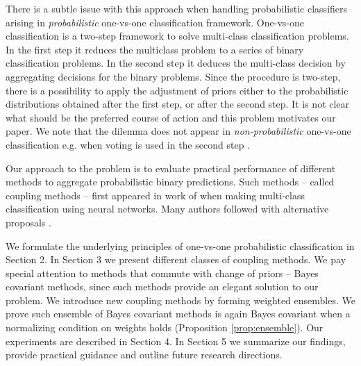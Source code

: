 There is a subtle issue with this approach  when handling probabilistic 
classifiers arising in \emph{probabilistic} one-vs-one classification framework.   
One-vs-one classification is a two-step framework to solve 
multi-class classification problems.
In the first step it reduces the multiclass problem to a series of binary
classification problems. 
In the second step it deduces the multi-class decision by aggregating decisions 
for the binary problems. Since the procedure is two-step, there is a possibility 
to apply the adjustment of priors either to the probabilistic distributions 
obtained after the first step, or after the second step. It is not clear what 
should be the preferred course of action and this problem motivates our paper. We note that the dilemma does not appear
in \emph{non-probabilistic} one-vs-one classification e.g. when voting is used in the second step \cite{galar2011overview}.


Our approach to the problem is to evaluate practical performance of different 
methods to aggregate probabilistic binary predictions. Such methods -- called coupling methods
-- first appeared in work of \cite{refregier1991probabilistic} when making 
multi-class classification using neural networks. 
Many authors followed with alternative proposals 
\cite{price1994pairwise, hastie1998classification,  zahorian1999partitioned,
wu2004probability, vsuch2015new, vsuch2016bayes}.

We formulate the underlying principles of one-vs-one probabilistic classification in Section 2. In Section 3 we present  different classes of coupling methods. 
We pay special attention to methods that commute with change of priors -- Bayes covariant methods, 
since such methods provide an  elegant solution to our problem. 
We introduce new coupling methods by forming weighted ensembles. We prove such ensemble of Bayes covariant methods is again Bayes covariant
when a normalizing condition on weights holds (Proposition \ref{prop:ensemble}).  
Our experiments are described in Section 4. In Section 5 we summarize our findings, 
provide practical guidance and outline future research directions.